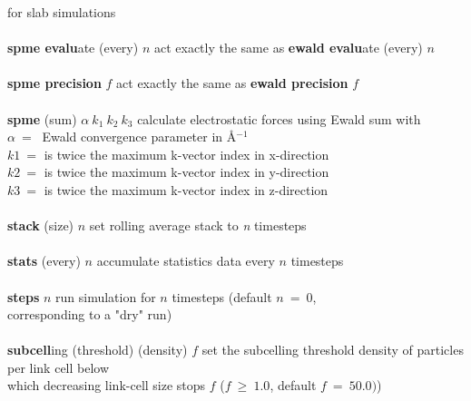 \begin{tabbing}
\>                                              \> for slab simulations \\
\>                                              \> \\
\> {\bf spme evalu}ate (every) $n$              \> act exactly the same as {\bf ewald evalu}ate (every) $n$ \\
\>                                              \> \\
\> {\bf spme precision} $f$                     \> act exactly the same as {\bf ewald precision} $f$ \\
\>                                              \> \\
\> {\bf spme} (sum) $\alpha~k_{1}~k_{2}~k_{3}$  \> calculate electrostatic forces using Ewald sum with \\
\>                                              \> $\alpha~=~$ Ewald convergence parameter in \AA$^{-1}$ \\
\>                                              \> $k1~=$ is twice the maximum k-vector index in x-direction \\
\>                                              \> $k2~=$ is twice the maximum k-vector index in y-direction \\
\>                                              \> $k3~=$ is twice the maximum k-vector index in z-direction \\
\>                                              \> \\
\> {\bf stack} (size) $n$                       \> set rolling average stack to {\em n} timesteps \\
\>                                              \> \\
\> {\bf stats} (every) $n$                      \> accumulate statistics data every $n$ timesteps \\
\>                                              \> \\
\> {\bf steps} $n$                              \> run simulation for $n$ timesteps (default $n~=~0$, \\
\>                                              \> corresponding to a "dry" run) \\
\>                                              \> \\
\> {\bf subcell}ing (threshold) (density) $f$   \> set the subcelling threshold density of particles per link cell below \\
\>                                              \> which decreasing link-cell size stops $f$ ($f~\ge~1.0$, default $f~=~50.0)$) \\

\end{tabbing}
